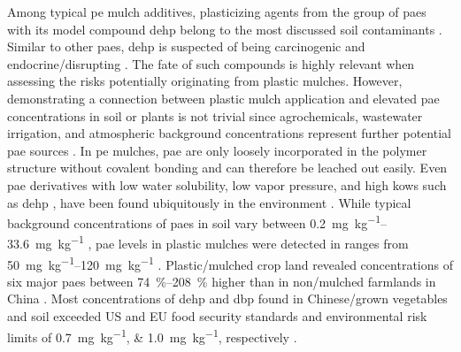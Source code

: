 Among typical \ac{pe} mulch additives, plasticizing agents from the group of \acp{pae} with its model compound \ac{dehp} belong to the most discussed soil contaminants \citep{FuUptake2011,MagdouliDi2013,WangSoil2013}. Similar to other \acp{pae}, \ac{dehp} is suspected of being carcinogenic and endocrine\-/disrupting \citep{ErkekogluGenotoxicity2014}. The fate of such compounds is highly relevant when assessing the risks potentially originating from plastic mulches. However, demonstrating a connection between plastic mulch application and elevated \ac{pae} concentrations in soil or plants is not trivial since agrochemicals, wastewater irrigation, and atmospheric background concentrations represent further potential \ac{pae} sources \citep{HongjunDistribution2013,WangSoil2013,HeContamination2014}. In \ac{pe} mulches, \ac{pae} are only loosely incorporated in the polymer structure without covalent bonding and can therefore be leached out easily. Even \ac{pae} derivatives with low water solubility, low vapor pressure, and high \acp{kow} such as \ac{dehp} \citep{MagdouliDi2013}, have been found ubiquitously in the environment \citep{FernandezOccurrence2012}. While typical background concentrations of \acp{pae} in soil vary between \SIrange[range-phrase = { and }]{0.2}{33.6}{\milli\gram\per\kilo\gram} \citep{ZengPhthalate2008}, \ac{pae} levels in plastic mulches were detected in ranges from \SIrange[range-phrase = { to }]{50}{120}{\milli\gram\per\kilo\gram} \citep{WangSoil2013}.
Plastic\-/mulched crop land revealed concentrations of six major \acp{pae} between \SIrange[range-phrase = { and }]{74}{208}{\percent} higher than in non\-/mulched farmlands in China \citep{KongDiversities2012}. Most concentrations of \ac{dehp} and \ac{dbp} found in Chinese\-/grown vegetables and soil exceeded US and EU food security standards and environmental risk limits of \SIlist{0.7;1.0}{\milli\gram\per\kilo\gram}, respectively \citep{vanWezelEnvironmental2000,WangOccurrence2015}.

